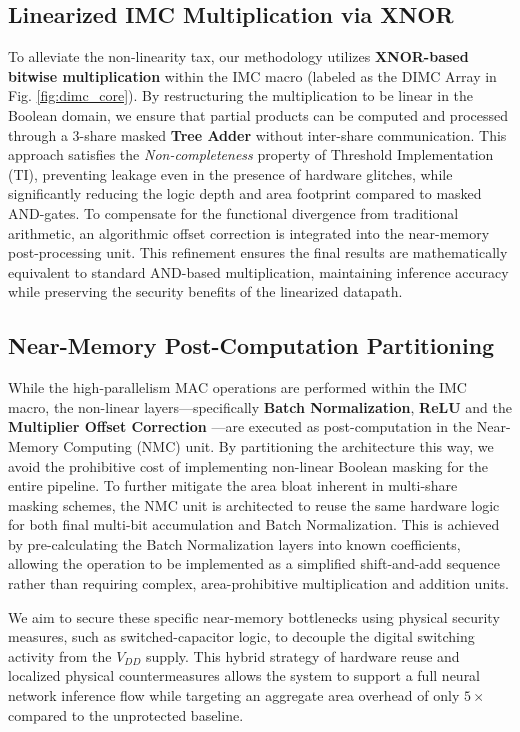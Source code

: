 \documentclass[journal]{IEEEtran}
\begin{document}
\subsection{Linearized IMC Multiplication via XNOR}
To alleviate the non-linearity tax, our methodology utilizes \textbf{XNOR-based bitwise multiplication} within the IMC macro (labeled as the DIMC Array in Fig. \ref{fig:dimc_core}). By restructuring the multiplication to be linear in the Boolean domain, we ensure that partial products can be computed and processed through a 3-share masked \textbf{Tree Adder} without inter-share communication. This approach satisfies the \textit{Non-completeness} property of Threshold Implementation (TI), preventing leakage even in the presence of hardware glitches, while significantly reducing the logic depth and area footprint compared to masked AND-gates. To compensate for the functional divergence from traditional arithmetic, an algorithmic offset correction is integrated into the near-memory post-processing unit. This refinement ensures the final results are mathematically equivalent to standard AND-based multiplication, maintaining inference accuracy while preserving the security benefits of the linearized datapath.

\subsection{Near-Memory Post-Computation Partitioning}
While the high-parallelism MAC operations are performed within the IMC macro, the non-linear layers—specifically \textbf{Batch Normalization}, \textbf{ReLU} and the \textbf{Multiplier Offset Correction} —are executed as post-computation in the Near-Memory Computing (NMC) unit. By partitioning the architecture this way, we avoid the prohibitive cost of implementing non-linear Boolean masking for the entire pipeline. To further mitigate the area bloat inherent in multi-share masking schemes, the NMC unit is architected to reuse the same hardware logic for both final multi-bit accumulation and Batch Normalization. This is achieved by pre-calculating the Batch Normalization layers into known coefficients, allowing the operation to be implemented as a simplified shift-and-add sequence rather than requiring complex, area-prohibitive multiplication and addition units. 



We aim to secure these specific near-memory bottlenecks using physical security measures, such as switched-capacitor logic, to decouple the digital switching activity from the $V_{DD}$ supply. This hybrid strategy of hardware reuse and localized physical countermeasures allows the system to support a full neural network inference flow while targeting an aggregate area overhead of only $5\times$ compared to the unprotected baseline.
\end{document}
